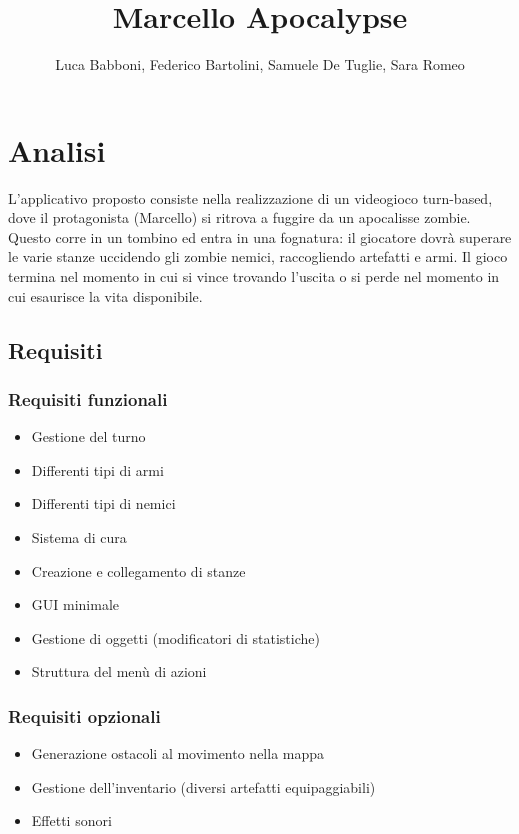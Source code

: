 \documentclass[a4paper,titlepage,12pt]{article}
\title{Marcello Apocalypse}
\author{Luca Babboni, Federico Bartolini, Samuele De Tuglie, Sara Romeo}
\begin{document}
\maketitle
\tableofcontents

\newpage
\section{Analisi}
L'applicativo proposto consiste nella realizzazione di un videogioco turn-based, dove il protagonista (Marcello) si ritrova a fuggire da un apocalisse zombie. Questo corre in un tombino ed entra in una fognatura: il giocatore dovrà superare le varie stanze uccidendo gli zombie nemici, raccogliendo artefatti e armi. Il gioco termina nel momento in cui si vince trovando l'uscita o si perde nel momento in cui esaurisce la vita disponibile.

\subsection{Requisiti}
\subsubsection*{Requisiti funzionali}
\begin{itemize}
    \item Gestione del turno
    \item Differenti tipi di armi
    \item Differenti tipi di nemici
    \item Sistema di cura 
    \item Creazione e collegamento di stanze 
    \item GUI minimale 
    \item Gestione di oggetti (modificatori di statistiche) 
    \item Struttura del menù di azioni 
\end{itemize}

\subsubsection*{Requisiti opzionali}
\begin{itemize}
    \item Generazione ostacoli al movimento nella mappa 
    \item Gestione dell'inventario (diversi artefatti equipaggiabili)
    \item Effetti sonori
\end{itemize}
\end{document}
